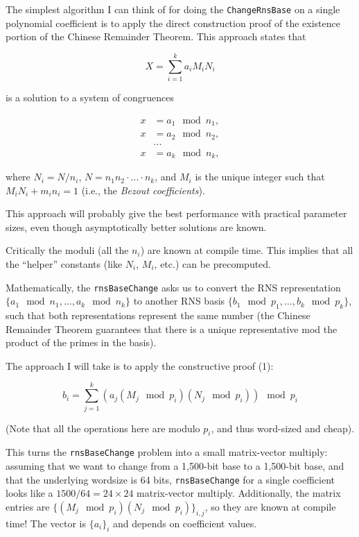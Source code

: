 The simplest algorithm I can think of for doing the \verb!ChangeRnsBase! on a single
polynomial coefficient is to apply the direct construction proof of the
existence portion of the Chinese Remainder Theorem\cite{gauss1966english}.
This approach states that

\begin{equation*}
X = \sum_{i=1}^k a_i M_i N_i
\end{equation*}

is a solution to a system of congruences

\begin{align*}
    x &= a_1 \mod n_1, \\
    x &= a_2 \mod n_2, \\
      &... \\
    x &= a_k \mod n_k,
\end{align*}

where $N_i = N/n_i$, $N=n_1n_2\cdot...\cdot n_k$, and $M_i$ is the unique integer
such that $M_iN_i + m_in_i = 1$ (i.e., the \emph{Bezout coefficients}).

This approach will probably give the best performance with practical parameter
sizes, even though asymptotically better solutions are known.

Critically the moduli (all the $n_i$) are known at compile time. This implies
that all the “helper” constants (like $N_i$, $M_i$, etc.) can be precomputed.

Mathematically, the \verb!rnsBaseChange! asks us to convert the RNS representation
$\{a_1 \mod n_1, …, a_k \mod n_k\}$ to another RNS basis $\{b_1 \mod p_1, …, b_k
\mod p_k\}$, such that both representations represent the same number (the
Chinese Remainder Theorem guarantees that there is a unique representative mod
the product of the primes in the basis).

The approach I will take is to apply the constructive proof (1):

\begin{equation*}
b_i = \sum_{j=1}^k (a_j (M_j \mod p_i) (N_j \mod p_i)) \mod p_i
\end{equation*}

(Note that all the operations here are modulo $p_i$, and thus word-sized and
cheap).

This turns the \verb!rnsBaseChange! problem into a small matrix-vector multiply:
assuming that we want to change from a 1,500-bit base to a 1,500-bit base, and
that the underlying wordsize is 64 bits, \verb!rnsBaseChange! for a single coefficient
looks like a $1500/64=24\times 24$ matrix-vector multiply.
Additionally, the matrix entries are $\{(M_j \mod p_i) (N_j \mod p_i)\}_{i,
j}$, so they are known at compile time!
The vector is $\{a_i\}_i$ and depends on coefficient values.

